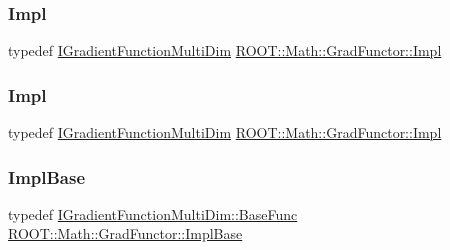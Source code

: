 \subsubsection{\texorpdfstring{Impl}{Impl}\hspace{0.1cm}{\footnotesize\ttfamily [2/3]}}
{\footnotesize\ttfamily typedef \mbox{\hyperlink{classROOT_1_1Math_1_1IGradientFunctionMultiDim}{I\+Gradient\+Function\+Multi\+Dim}} \mbox{\hyperlink{classROOT_1_1Math_1_1GradFunctor_a4ce94e1b525d38a2d7da3c88ace6e0f9}{R\+O\+O\+T\+::\+Math\+::\+Grad\+Functor\+::\+Impl}}}

\mbox{\label{classROOT_1_1Math_1_1GradFunctor_a4ce94e1b525d38a2d7da3c88ace6e0f9}} 
\subsubsection{\texorpdfstring{Impl}{Impl}\hspace{0.1cm}{\footnotesize\ttfamily [3/3]}}
{\footnotesize\ttfamily typedef \mbox{\hyperlink{classROOT_1_1Math_1_1IGradientFunctionMultiDim}{I\+Gradient\+Function\+Multi\+Dim}} \mbox{\hyperlink{classROOT_1_1Math_1_1GradFunctor_a4ce94e1b525d38a2d7da3c88ace6e0f9}{R\+O\+O\+T\+::\+Math\+::\+Grad\+Functor\+::\+Impl}}}

\mbox{\label{classROOT_1_1Math_1_1GradFunctor_a1fb9161fc93c7e7fa185dddbcc2c4f4d}} 
\subsubsection{\texorpdfstring{ImplBase}{ImplBase}\hspace{0.1cm}{\footnotesize\ttfamily [1/3]}}
{\footnotesize\ttfamily typedef \mbox{\hyperlink{classROOT_1_1Math_1_1IGradientFunctionMultiDim_a803074495bafb5acf9f130b648001609}{I\+Gradient\+Function\+Multi\+Dim\+::\+Base\+Func}} \mbox{\hyperlink{classROOT_1_1Math_1_1GradFunctor_a1fb9161fc93c7e7fa185dddbcc2c4f4d}{R\+O\+O\+T\+::\+Math\+::\+Grad\+Functor\+::\+Impl\+Base}}}

\mbox{\label{classROOT_1_1Math_1_1GradFunctor_a1fb9161fc93c7e7fa185dddbcc2c4f4d}} 

